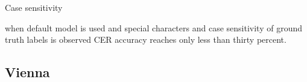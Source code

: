 








Case sensitivity


when default model is used and special characters and case sensitivity of ground truth labels is observed CER accuracy reaches only less than thirty percent. 


\subsection*{Vienna}

